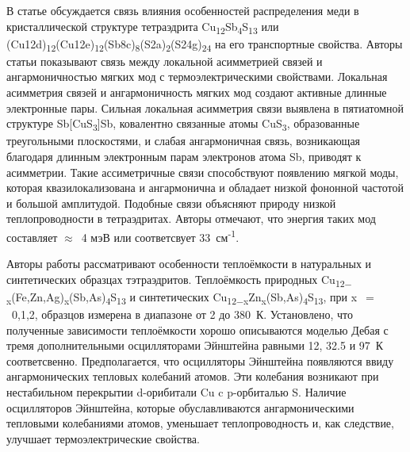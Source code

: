 В статье \cite{Lai_2015} обсуждается связь влияния особенностей распределения меди в кристаллической структуре тетраэдрита Cu\textsubscript{12}Sb\textsubscript{4}S\textsubscript{13} или (Cu12d)\textsubscript{12}(Cu12e)\textsubscript{12}(Sb8c)\textsubscript{8}(S2a)\textsubscript{2}(S24g)\textsubscript{24} на его транспортные свойства. Авторы статьи показывают связь между локальной асимметрией связей и ангармоничностью мягких мод с термоэлектрическими свойствами.  Локальная асимметрия связей и ангармоничность мягких мод создают активные длинные электронные пары. Сильная локальная асимметрия связи выявлена в пятиатомной структуре Sb[CuS\textsubscript{3}]Sb, ковалентно связанные атомы CuS\textsubscript{3}, образованные треугольными плоскостями, и слабая ангармоничная связь, возникающая благодаря длинным электронным парам электронов атома Sb, приводят к асимметрии. Такие ассиметричные связи способствуют появлению мягкой моды, которая квазилокализована и ангармонична и обладает низкой фононной частотой и большой амплитудой. Подобные связи объясняют природу низкой теплопроводности в тетраэдритах. Авторы отмечают, что энергия таких мод составляет $\approx$~4 мэВ или соответсвует 33~см\textsuperscript{-1}.

Авторы работы \cite{Lara-Curzio2014} рассматривают особенности теплоёмкости в натуральных и синтетических образцах тэтраэдритов. Теплоёмкость природных  Cu\textsubscript{12$-$x}(Fe,Zn,Ag)\textsubscript{x}(Sb,As)\textsubscript{4}S\textsubscript{13} и синтетических Cu\textsubscript{12$-$x}Zn\textsubscript{x}(Sb,As)\textsubscript{4}S\textsubscript{13}, при x~$=$~0,1,2, образцов измерена в диапазоне от 2 до 380~К. Установлено, что полученные зависимости теплоёмкости хорошо описываются моделью Дебая с тремя дополнительными осцилляторами Эйнштейна равными 12, 32.5 и 97~К соответсвенно. Предполагается, что осцилляторы Эйнштейна появляются ввиду ангармонических тепловых колебаний атомов. Эти колебания возникают при нестабильном перекрытии d-орибитали Cu c p-орбиталью S.
Наличие осцилляторов Эйнштейна, которые обуславливаются ангармоническими тепловыми колебаниями атомов, уменьшает теплопроводность и, как следствие, улучшает термоэлектрические свойства.

